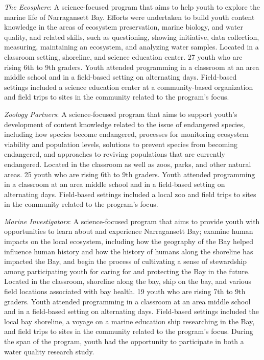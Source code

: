 \documentclass[]{book}
\theoremstyle{definition}
\theoremstyle{definition}
\theoremstyle{definition}
\theoremstyle{remark}
\begin{document}
\emph{The Ecosphere}: A science-focused program that aims to help youth
to explore the marine life of Narragansett Bay. Efforts were undertaken
to build youth content knowledge in the areas of ecosystem preservation,
marine biology, and water quality, and related skills, such as
questioning, showing initiative, data collection, measuring, maintaining
an ecosystem, and analyzing water samples. Located in a classroom
setting, shoreline, and science education center. 27 youth who are
rising 6th to 9th graders. Youth attended programming in a classroom at
an area middle school and in a field-based setting on alternating days.
Field-based settings included a science education center at a
community-based organization and field trips to sites in the community
related to the program's focus.

\emph{Zoology Partners}: A science-focused program that aims to support
youth's development of content knowledge related to the issue of
endangered species, including how species become endangered, processes
for monitoring ecosystem viability and population levels, solutions to
prevent species from becoming endangered, and approaches to reviving
populations that are currently endangered. Located in the classroom as
well as zoos, parks, and other natural areas. 25 youth who are rising
6th to 9th graders. Youth attended programming in a classroom at an area
middle school and in a field-based setting on alternating days.
Field-based settings included a local zoo and field trips to sites in
the community related to the program's focus.

\emph{Marine Investigators}: A science-focused program that aims to
provide youth with opportunities to learn about and experience
Narragansett Bay; examine human impacts on the local ecosystem,
including how the geography of the Bay helped influence human history
and how the history of humans along the shoreline has impacted the Bay,
and begin the process of cultivating a sense of stewardship among
participating youth for caring for and protecting the Bay in the future.
Located in the classroom, shoreline along the bay, ship on the bay, and
various field locations associated with bay health. 19 youth who are
rising 7th to 9th graders. Youth attended programming in a classroom at
an area middle school and in a field-based setting on alternating days.
Field-based settings included the local bay shoreline, a voyage on a
marine education ship researching in the Bay, and field trips to sites
in the community related to the program's focus. During the span of the
program, youth had the opportunity to participate in both a water
quality research study.
\end{document}
